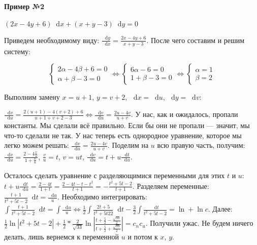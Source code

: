 \documentclass{article}
\newcommand*\diff{\mathop{}\!\mathrm{d}}
\begin{document}
\begin{enumerate}
    \paragraph{Пример №2} $(2x - 4y + 6) \diff x + (x + y - 3) \diff y = 0$

    Приведем необходимому виду: $\frac{\diff y}{\diff x} = \frac{2x - 4y + 6}{x + y - 3}$. После чего составим и решим систему:

    $$
    \begin{cases}
        2 \alpha - 4 \beta + 6 = 0 \\
        \alpha + \beta - 3 = 0
    \end{cases} \Longleftrightarrow \begin{cases}
        6 \alpha - 6 = 0 \\
        1 + \beta - 3 = 0
    \end{cases} \Longleftrightarrow \begin{cases}
        \alpha = 1 \\
        \beta = 2
    \end{cases}
    $$

    Выполним замену $x = u + 1$, $y = v + 2$, $\diff x = \diff u$, $\diff y = \diff v$:

    $\frac{\diff v}{\diff u} = \frac{2 (u + 1) - 4 (v + 2) + 6}{u + 1 + v + 2 - 3} \Longleftrightarrow \frac{\diff v}{\diff u} = \frac{2 u - 4v}{u + v}$. У нас, как и ожидалось, пропали константы. Мы сделали всё правильно. Если бы они не пропали — значит, мы что-то сделали не так. У нас теперь есть однородное уравнение, которое мы легко можем решать: $\frac{\diff v}{\diff u} = \frac{2 u - 4v}{u + v}$. Поделим на $u$ всю правую часть, получим: $\frac{\diff v}{\diff u} = \frac{2 - 4 \frac{v}{u}}{1 + \frac{v}{u}}$, $\frac{v}{u} = t$, $v = ut$, $\frac{\diff v}{\diff u} = t + u \frac{\diff t}{\diff u}$. 
    
    Осталось сделать уравнение с разделяющимися переменными для этих $t$ и $u$: $t + u \frac{\diff t}{\diff u} = \frac{2 - 4t}{1 + t} = \frac{2 - 4t - t - t^2}{t + 1} = - \frac{t^2 + 5t - 2}{t + 1}$. Разделяем переменные: $\frac{t + 1}{t^2 + 5t - 2} \diff t = \frac{\diff u}{u}$. Необходимо интегрировать:  $\int \frac{t + 1}{t^2 + 5t - 2} \diff t = \int \frac{\diff u}{u} \Longleftrightarrow \frac{1}{2} \int \frac{2 t + 5}{t^2 + 5t 2 2} \diff t - \frac{3}{2} \int \frac{\diff t}{t^2 + 5t - 2} = \ln + \ln c$. Далее: $\frac{1}{2} \ln |t^2 + 5t - 2| + \frac{1}{2} * \frac{2}{\sqrt{33}} \ln |\frac{t + \frac{5}{2} - \frac{\sqrt{33}}{2}}{t + \frac{5}{2} + \frac{\sqrt{33}}{2}}| = c_n c_u$. Получили ужас. Не будем ничего делать, лишь вернемся к переменной $u$ и потом к $x$, $y$.
\end{enumerate}
\end{document}
